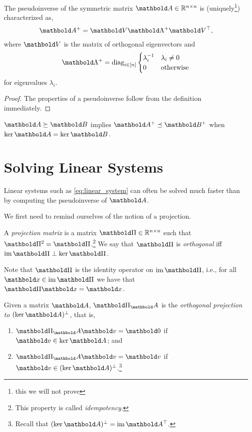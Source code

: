 \begin{lem}
The pseudoinverse of the symmetric matrix $\mA \in \R^{n \times n}$ is (uniquely\footnote{this we will not prove}) characterized as, \begin{align}
    \pinv{\mA} = \mV\pinv{\mLambda}\trans{\mV},
\end{align} where $\mV$ is the matrix of orthogonal eigenvectors and \begin{align}
    \pinv{\mLambda} = \diag_{i\in[n]}\begin{cases}
    \inv{\lambda_i} & \lambda_i \neq 0 \\
    0 & \text{otherwise}
    \end{cases} \label{eq:pseudoinverse_spectrum}
\end{align} for eigenvalues $\lambda_i$.
\end{lem}
\begin{proof}
The properties of a pseudoinverse follow from the definition immediately.
\end{proof}

\begin{cor}
$\mA \succeq \mB$ implies $\pinv{\mA} \preceq \pinv{\mB}$ when $\ker\mA = \ker\mB$.
\end{cor}

\section{Solving Linear Systems}

Linear systems such as \cref{eq:linear_system} can often be solved much faster than by computing the pseudoinverse of $\mA$.

We first need to remind ourselves of the notion of a projection.

\begin{defn} A \emph{projection matrix} is a matrix $\mPi \in \R^{n \times n}$ such that $\mPi^2 = \mPi$.\footnote{This property is called \emph{idempotency}.} We say that $\mPi$ is \emph{orthogonal} iff $\im\mPi \perp \ker\mPi$.
\end{defn}
\begin{rmk}
Note that $\mPi$ is the identity operator on $\im\mPi$, i.e., for all $\vx \in \im\mPi$ we have that $\mPi\vx = \vx$.
\end{rmk}

\begin{defn} Given a matrix $\mA$, $\mPi_\mA$ is the \emph{orthogonal projection to $\compl{(\ker{\mA})}$}, that is, \begin{enumerate}
    \item $\mPi_\mA \vv = \vZero$ if $\vv \in \ker{\mA}$; and
    \item $\mPi_\mA \vv = \vv$ if $\vv \in \compl{(\ker{\mA})}$.\footnote{Recall that $\compl{(\ker{\mA})} = \im{\trans{\mA}}$.}
\end{enumerate}
\end{defn}

